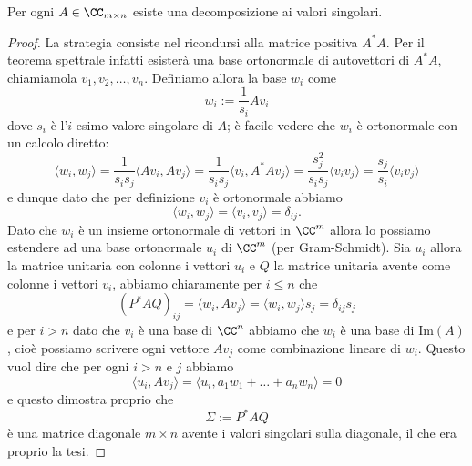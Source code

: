 \documentclass[11pt]{scrartcl}
\newcommand{\Immagine}[1]{\text{Im}\left(#1\right)}
\begin{document}
   	 \begin{theorem}
   	 	Per ogni $A\in \CC_{m\times n}$ esiste una decomposizione ai valori singolari.
   	 \end{theorem}
   	 \begin{proof}
   	 	La strategia consiste nel ricondursi alla matrice positiva $A^*A$. Per il teorema spettrale infatti esisterà una base ortonormale di autovettori di $A^*A$, chiamiamola $v_1,v_2,\dots,v_n$. Definiamo allora la base $w_i$ come
   	 	$$w_i:=\frac{1}{s_i}Av_i$$
   	 	dove $s_i$ è l'$i$-esimo valore singolare di $A$; è facile vedere che $w_i$ è ortonormale con un calcolo diretto:
   	 	$$\langle w_i,w_j\rangle=\frac{1}{s_is_j}\langle Av_i,Av_j\rangle =\frac{1}{s_is_j}\langle v_i,A^*Av_j\rangle=\frac{s_j^2}{s_is_j}\langle v_iv_j\rangle=\frac{s_j}{s_i}\langle v_iv_j\rangle$$
   	 	e dunque dato che per definizione $v_i$ è ortonormale abbiamo
   	 	$$\langle w_i,w_j\rangle = \langle v_i,v_j\rangle =\delta_{ij}.$$
   	 	Dato che $w_i$ è un insieme ortonormale di vettori in $\CC^m$ allora lo possiamo estendere ad una base ortonormale $u_i$ di $\CC^m$ (per Gram-Schmidt). Sia $u_i$ allora la matrice unitaria con colonne i vettori $u_i$ e $Q$ la matrice unitaria avente come colonne i vettori $v_i$, abbiamo chiaramente per $i\le n$ che 
   	 	$$(P^*AQ)_{ij}=\langle w_i,Av_j\rangle=\langle w_i,w_j\rangle s_j=\delta_{ij}s_j$$
   	 	e per $i> n$ dato che $v_i$ è una base di $\CC^n$ abbiamo che $w_i$ è una base di $\Immagine{A}$, cioè possiamo scrivere ogni vettore $Av_j$ come combinazione lineare di $w_i$. Questo vuol dire che per ogni $i>n$ e $j$ abbiamo
   	 	$$\langle u_i,Av_j\rangle = \langle u_i, a_1w_1+\dots+a_nw_n\rangle=0$$
   	 	e questo dimostra proprio che 
   	 	$$\Sigma:=P^*AQ$$
   	 	è una matrice diagonale $m\times n$ avente i valori singolari sulla diagonale, il che era proprio la tesi.
   	 \end{proof}
   	 
\end{document}
